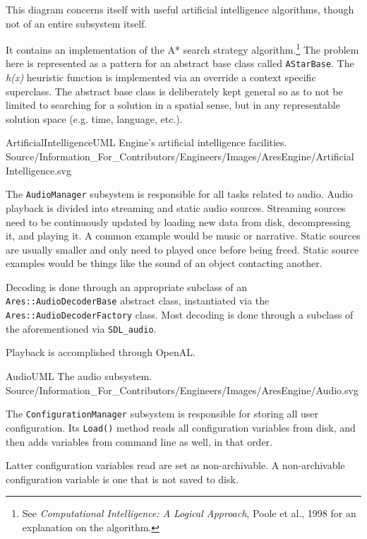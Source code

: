 This diagram concerns itself with useful artificial intelligence algorithms, though not of an entire subsystem itself.

It contains an implementation of the A* search strategy algorithm.\footnote{See {\it Computational Intelligence: A Logical Approach}, Poole et al., 1998 for an explanation on the algorithm.} The problem here is represented as a pattern for an abstract base class called {\tt AStarBase}. The {\it h(x)} heuristic function is implemented via an override a context specific superclass. The abstract base class is deliberately kept general so as to not be limited to searching for a solution in a spatial sense, but in any representable solution space (e.g. time, language, etc.).

\FullPageLandscapeDiagram
    {ArtificialIntelligenceUML}
    {Engine's artificial intelligence facilities.}
    {Source/Information_For_Contributors/Engineers/Images/AresEngine/Artificial Intelligence.svg}

\page
{}
The {\tt AudioManager} subsystem is responsible for all tasks related to audio. Audio playback is divided into streaming and static audio sources. Streaming sources need to be continuously updated by loading new data from disk, decompressing it, and playing it. A common example would be music or narrative. Static sources are usually smaller and only need to played once before being freed. Static source examples would be things like the sound of an object contacting another.

Decoding is done through an appropriate subclass of an {\tt Ares::AudioDecoderBase} abstract class, instantiated via the {\tt Ares::AudioDecoderFactory} class. Most decoding is done through a subclass of the aforementioned via {\tt SDL_audio}.

Playback is accomplished through OpenAL.

\FullPageLandscapeDiagram
    {AudioUML}
    {The audio subsystem.}
    {Source/Information_For_Contributors/Engineers/Images/AresEngine/Audio.svg}

\page
{}
The {\tt ConfigurationManager} subsystem is responsible for storing all user configuration. Its {\tt Load()} method reads all configuration variables from disk, and then adds variables from command line as well, in that order. 

Latter configuration variables read are set as non-archivable. A non-archivable configuration variable is one that is not saved to disk.


